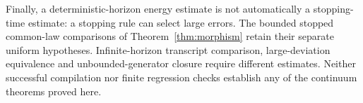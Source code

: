 Finally, a deterministic-horizon energy estimate is not automatically a stopping-time estimate: a stopping rule can select large errors. The bounded stopped common-law comparisons of Theorem~\ref{thm:morphism} retain their separate uniform hypotheses. Infinite-horizon transcript comparison, large-deviation equivalence and unbounded-generator closure require different estimates. Neither successful compilation nor finite regression checks establish any of the continuum theorems proved here.
